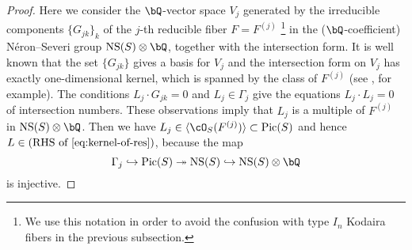 \documentclass{amsart}
\numberwithin{equation}{section}
\theoremstyle{plain}
\theoremstyle{definition}
\DeclareMathOperator{\Pic}{\mathrm{Pic}}
\DeclareMathOperator{\NS}{\mathrm{NS}}
\begin{document}
\begin{proof}
    Here we consider the $\bQ$-vector space $V_j$ generated by the irreducible components $\{G_{jk}\}_k$ of the $j$-th reducible fiber $F = F^{(j)}$ \footnote{We use this notation in order to avoid the confusion with type $I_n$ Kodaira fibers in the previous subsection.} in the ($\bQ$-coefficient) N\'{e}ron--Severi group $\NS(S) \otimes \bQ$, together with the intersection form.
    It is well known that the set $\{G_{jk}\}$ gives a basis for $V_j$ and the intersection form on $V_j$ has exactly one-dimensional kernel, which is spanned by the class of $F^{(j)}$ (see \cite{MR1078016}, for example).
    The conditions $L_j \cdot G_{jk} = 0$ and $L_j \in \Gamma_j$ give the equations $L_j \cdot L_j = 0$ of intersection numbers.
    These observations imply that $L_j$ is a multiple of $F^{(j)}$ in $\NS(S) \otimes \bQ$.
    Then we have $L_j \in \langle \cO_S(F^{(j)}) \rangle \subset \Pic(S)$ and hence $L \in (\text{RHS of \eqref{eq:kernel-of-res}})$, because the map
    \begin{equation}
        \Gamma_j \hookrightarrow \Pic(S) \twoheadrightarrow \NS(S) \hookrightarrow \NS(S) \otimes \bQ
    \end{equation}
    is injective.
\end{proof}
\end{document}
